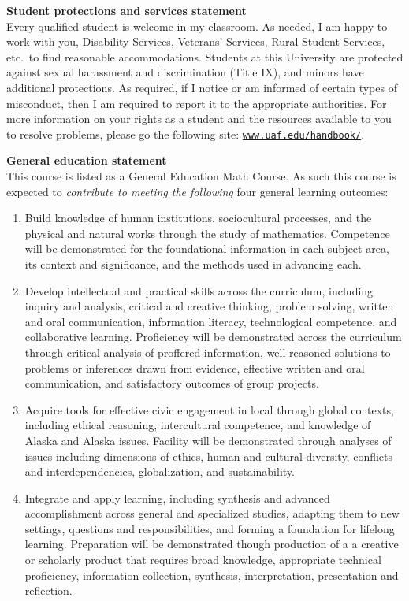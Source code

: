 \documentclass[12pt]{article}
\renewcommand{\emph}[1]{\textsf{\textbf{#1}}}
\newcommand{\localhead}[1]{\par\smallskip\textbf{#1} \smallskip\nobreak\\}%
\def\subheading#1{\localhead{\emph{#1}}}
\begin{document}
\subheading{Student protections and services statement}
Every qualified student is welcome in my classroom.  As needed, I am happy to work with you, Disability Services, Veterans' Services, Rural Student Services, etc.~to find reasonable accommodations.  Students at this University are protected against sexual harassment and discrimination (Title IX), and minors have additional protections.  As required, if I notice or am informed of certain types of misconduct, then I am required to report it to the appropriate authorities.  For more information on your rights as a student and the resources available to you to resolve problems, please go the following site: \href{https://www.uaf.edu/handbook/}{\texttt{www.uaf.edu/handbook/}}.

\clearpage\newpage

\strut

\vspace{-12pt}


\subheading{General education statement}
This course is listed as a General Education Math Course.  As such
this course is expected to \textsl{contribute to meeting the
following} four general learning outcomes:

\begin{enumerate}
\item Build knowledge of human institutions, sociocultural processes,
and the physical and natural works through the study of mathematics.
Competence will be demonstrated for the foundational information in
each subject area, its context and significance, and the methods used
in advancing each.

\item Develop intellectual and practical skills across the curriculum,
including inquiry and analysis, critical and creative thinking,
problem solving, written and oral communication, information literacy,
technological competence, and collaborative learning. Proficiency will
be demonstrated across the curriculum through critical analysis of
proffered information, well-reasoned solutions to problems or
inferences drawn from evidence, effective written and oral
communication, and satisfactory outcomes of group projects.

\item Acquire tools for effective civic engagement in local through
global contexts, including ethical reasoning, intercultural
competence, and knowledge of Alaska and Alaska issues.  Facility will
be demonstrated through analyses of issues including dimensions of
ethics, human and cultural diversity, conflicts and interdependencies,
globalization, and sustainability.

\item Integrate and apply learning, including synthesis and advanced
accomplishment across general and specialized studies, adapting them
to new settings, questions and responsibilities, and forming a
foundation for lifelong learning. Preparation will be demonstrated
though production of a a creative or scholarly product that requires
broad knowledge, appropriate technical proficiency, information
collection, synthesis, interpretation, presentation and reflection.
\end{enumerate}
\end{document}
